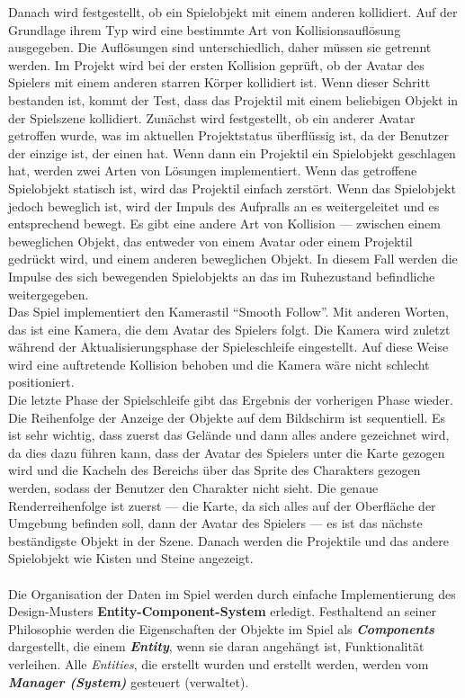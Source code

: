 \documentclass[
  10pt,
  a4paper,
  oneside,
  headers,
  headinclude,
  footinclude,
  BCOR5mm,
]{article}
\begin{document}
Danach wird festgestellt, ob ein Spielobjekt mit einem anderen kollidiert. Auf der Grundlage ihrem Typ wird eine bestimmte Art von Kollisionsauflösung ausgegeben. Die Auflösungen sind unterschiedlich, daher müssen sie getrennt werden. Im Projekt wird bei der ersten Kollision geprüft, ob der Avatar des Spielers mit einem anderen starren Körper kollidiert ist. Wenn dieser Schritt bestanden ist, kommt der Test, dass das Projektil mit einem beliebigen Objekt in der Spielszene kollidiert. Zunächst wird festgestellt, ob ein anderer Avatar getroffen wurde, was im aktuellen Projektstatus überflüssig ist, da der Benutzer der einzige ist, der einen hat. Wenn dann ein Projektil ein Spielobjekt geschlagen hat, werden zwei Arten von Lösungen implementiert. Wenn das getroffene Spielobjekt statisch ist, wird das Projektil einfach zerstört. Wenn das Spielobjekt jedoch beweglich ist, wird der Impuls des Aufpralls an es weitergeleitet und es entsprechend bewegt. Es gibt eine andere Art von Kollision --- zwischen einem beweglichen Objekt, das entweder von einem Avatar oder einem Projektil gedrückt wird, und einem anderen beweglichen Objekt. In diesem Fall werden die Impulse des sich bewegenden Spielobjekts an das im Ruhezustand befindliche weitergegeben.\\
Das Spiel implementiert den Kamerastil ``Smooth Follow''. Mit anderen Worten, das ist eine Kamera, die dem Avatar des Spielers folgt. Die Kamera wird zuletzt während der Aktualisierungsphase der Spieleschleife eingestellt. Auf diese Weise wird eine auftretende Kollision behoben und die Kamera wäre nicht schlecht positioniert.\\
Die letzte Phase der Spielschleife gibt das Ergebnis der vorherigen Phase wieder. Die Reihenfolge der Anzeige der Objekte auf dem Bildschirm ist sequentiell. Es ist sehr wichtig, dass zuerst das Gelände und dann alles andere gezeichnet wird, da dies dazu führen kann, dass der Avatar des Spielers unter die Karte gezogen wird und die Kacheln des Bereichs über das Sprite des Charakters gezogen werden, sodass der Benutzer den Charakter nicht sieht. Die genaue Renderreihenfolge ist zuerst --- die Karte, da sich alles auf der Oberfläche der Umgebung befinden soll, dann der Avatar des Spielers --- es ist das nächste beständigste Objekt in der Szene. Danach werden die Projektile und das andere Spielobjekt wie Kisten und Steine angezeigt.
\paragraph{}
Die Organisation der Daten im Spiel werden durch einfache Implementierung des Design-Musters \textbf{Entity-Component-System} erledigt. Festhaltend an seiner Philosophie werden die Eigenschaften der Objekte im Spiel als \textit{\textbf{Components}} dargestellt, die einem \textit{\textbf{Entity}}, wenn sie daran angehängt ist, Funktionalität verleihen. Alle \textit{Entities}, die erstellt wurden und erstellt werden, werden vom \textit{\textbf{Manager (System)}} gesteuert (verwaltet).\\
\end{document}
